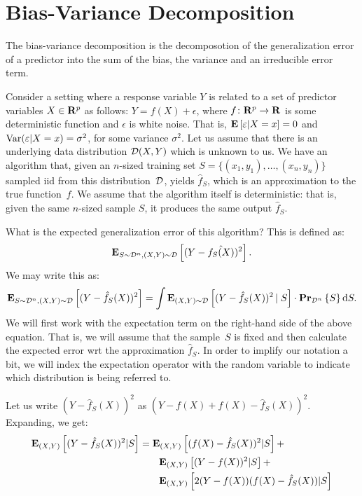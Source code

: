 \chapter{Bias-Variance Decomposition}

The bias-variance decomposition is the decomposotion of the generalization
error of a predictor into the sum of the bias, the variance and an irreducible
error term.

Consider a setting where a response variable $Y$ is related to a set of
predictor variables $X \in \mathbf{R}^p$ as follows: $Y = f(X) + \epsilon$, where
$f \colon \mathbf{R}^p \rightarrow \mathbf{R}$ is some deterministic function and
$\epsilon$ is white noise. That is, $\mathbf{E} \left [ \varepsilon \vert X = x \right ] = 0$ and
$\text{Var} (\varepsilon \vert X = x) = \sigma^2$, for some variance $\sigma^2$. Let us
assume that there is an underlying data distribution $\mathcal{D} (X, Y)$ which is
unknown to us. We have an algorithm that, given an $n$-sized training set
$S = \{ (x_1, y_1), \ldots, (x_n, y_n) \}$ sampled iid from this distribution~$\mathcal{D}$,
yields $\hat{f}_S$, which is an approximation to the true function~$f$.
We assume that the algorithm itself is deterministic: that is, given the same
$n$-sized sample $S$, it produces the same output $\hat{f}_S$.

What is the expected generalization error of this algorithm? This is defined
as:
\begin{equation}
    \mathbf{E}_{S \sim \mathcal{D}^n, (X, Y) \sim \mathcal{D}} \left [ (Y - \hat{f_S(X)})^2 \right ].
\end{equation}
We may write this as:
\begin{equation} \label{eqn:basic_integral}
    \mathbf{E}_{S \sim \mathcal{D}^n, (X, Y) \sim \mathcal{D}} \left [ (Y - \hat{f}_S(X))^2 \right ] =
    \int \mathbf{E}_{(X, Y) \sim \mathcal{D}} \left [ (Y - \hat{f}_S(X))^2 \left \vert \right . S \right ]
    \cdot \mathbf{Pr}_{\mathcal{D}^n} \left \{ S \right \} \text{d} S.
\end{equation}
We will first work with the expectation term on the right-hand side of the above
equation. That is, we will assume that the sample~$S$ is fixed and then calculate
the expected error wrt the approximation $\hat{f}_S$. In order to implify our
notation a bit, we will index the expectation operator with the random variable
to indicate which distribution is being referred to.

Let us write $(Y - \hat{f}_S(X))^2$ as $(Y - f(X) + f(X) - \hat{f}_S(X))^2$.
Expanding, we get:
\begin{equation}\label{eqn:break_up}
\begin{split}
    \mathbf{E}_{(X, Y)} \left [ (Y - \hat{f}_S(X))^2 \vert S \right ] & =
    \mathbf{E}_{(X, Y)} \left [ (f(X) - \hat{f}_S(X))^2 \vert S \right ] + \\
    & \quad \quad \mathbf{E}_{(X, Y)} \left [ (Y - f(X))^2 \vert S \right ] + \\
    & \quad \quad \mathbf{E}_{(X, Y)} \left [ 2 (Y - f(X)) (f(X) - \hat{f}_S(X)) \vert S \right ]
\end{split}
\end{equation}

